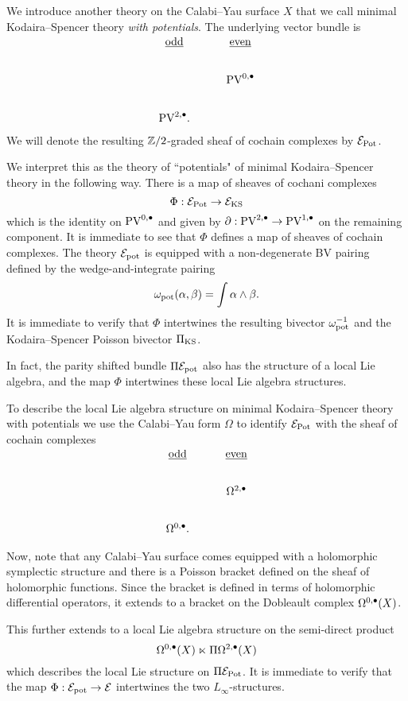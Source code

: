 \documentclass[11pt]{amsart}
\def\PV{{\rm PV}}
\begin{document}
We introduce another theory on the Calabi--Yau surface $X$ that we call minimal Kodaira--Spencer theory {\em with potentials}.
The underlying vector bundle is
\[
\begin{tikzcd}
\ul{\rm odd} & \ul{\rm even} \\
 & \PV^{0,\bu} \\
 \PV^{2,\bu}  .
\end{tikzcd}
\]
We will denote the resulting $\mathbb Z /2$-graded sheaf of cochain complexes by $\mathcal E_{\rm Pot}$.

We interpret this as the theory of  ``potentials"  of minimal Kodaira--Spencer theory in the following way.
There is a map of sheaves of cochani complexes
\[
\Phi : \mathcal E_{\rm Pot} \to \mathcal E_{\rm KS}
\]
which is the identity on $\PV^{0,\bu}$ and given by $\partial : \PV^{2,\bu} \to \PV^{1,\bu}$ on the remaining component.
It is immediate to see that $\Phi$ defines a map of sheaves of cochain complexes.
The theory $\mathcal E_{\rm pot}$ is equipped with a non-degenerate BV pairing defined by the wedge-and-integrate pairing
\[
\omega_{\rm pot} (\alpha, \beta) = \int \alpha \wedge \beta  .
\]
It is immediate to verify that $\Phi$ intertwines the resulting bivector $\omega_{\rm pot}^{-1}$ and the Kodaira--Spencer Poisson bivector $\Pi_{\rm KS}$.

In fact, the parity shifted bundle $\Pi \mathcal E_{\rm pot}$ also has the structure of a local Lie algebra, and the map $\Phi$ intertwines these local Lie algebra structures.

To describe the local Lie algebra structure on minimal Kodaira--Spencer theory with potentials we use the Calabi--Yau form $\Omega$ to identify $\mathcal E_{\rm Pot}$ with the sheaf of cochain complexes
\[
\begin{tikzcd}
\ul{\rm odd} & \ul{\rm even} \\
 & \Omega^{2,\bu} \\
 \Omega^{0,\bu}  .
\end{tikzcd}
\]

Now, note that any Calabi--Yau surface comes equipped with a holomorphic symplectic structure and there is a Poisson bracket defined on the sheaf of holomorphic functions.
Since the bracket is defined in terms of holomorphic differential operators, it extends to a bracket on the Dobleault complex $\Omega^{0,\bullet}(X)$.

This further extends to a local Lie algebra structure on the semi-direct product
\[
\Omega^{0,\bullet}(X) \ltimes \Pi \Omega^{2,\bullet}(X)
\]
which describes the local Lie structure on $\Pi \mathcal E_{\rm Pot}$.
It is immediate to verify that the map $\Phi : \mathcal E_{\rm pot} \to \mathcal E$ intertwines the two $L_\infty$-structures.
\end{document}
